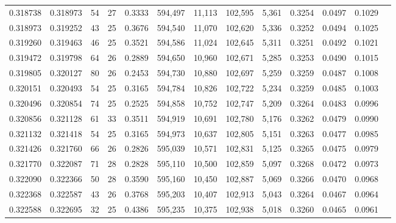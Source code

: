 \begin{tabular}{rrrrrrrrrrrrr}
0.318738 & 0.318973 &  54 &  27 &                                     0.3333 & 594,497 &  11,113 & 102,595 &   5,361 & 0.3254 & 0.0497 & 0.1029 \\
0.318973 & 0.319252 &  43 &  25 &                                     0.3676 & 594,540 &  11,070 & 102,620 &   5,336 & 0.3252 & 0.0494 & 0.1025 \\
0.319260 & 0.319463 &  46 &  25 &                                     0.3521 & 594,586 &  11,024 & 102,645 &   5,311 & 0.3251 & 0.0492 & 0.1021 \\
0.319472 & 0.319798 &  64 &  26 &                                     0.2889 & 594,650 &  10,960 & 102,671 &   5,285 & 0.3253 & 0.0490 & 0.1015 \\
0.319805 & 0.320127 &  80 &  26 &                                     0.2453 & 594,730 &  10,880 & 102,697 &   5,259 & 0.3259 & 0.0487 & 0.1008 \\
0.320151 & 0.320493 &  54 &  25 &                                     0.3165 & 594,784 &  10,826 & 102,722 &   5,234 & 0.3259 & 0.0485 & 0.1003 \\
0.320496 & 0.320854 &  74 &  25 &                                     0.2525 & 594,858 &  10,752 & 102,747 &   5,209 & 0.3264 & 0.0483 & 0.0996 \\
0.320856 & 0.321128 &  61 &  33 &                                     0.3511 & 594,919 &  10,691 & 102,780 &   5,176 & 0.3262 & 0.0479 & 0.0990 \\
0.321132 & 0.321418 &  54 &  25 &                                     0.3165 & 594,973 &  10,637 & 102,805 &   5,151 & 0.3263 & 0.0477 & 0.0985 \\
0.321426 & 0.321760 &  66 &  26 &                                     0.2826 & 595,039 &  10,571 & 102,831 &   5,125 & 0.3265 & 0.0475 & 0.0979 \\
0.321770 & 0.322087 &  71 &  28 &                                     0.2828 & 595,110 &  10,500 & 102,859 &   5,097 & 0.3268 & 0.0472 & 0.0973 \\
0.322090 & 0.322366 &  50 &  28 &                                     0.3590 & 595,160 &  10,450 & 102,887 &   5,069 & 0.3266 & 0.0470 & 0.0968 \\
0.322368 & 0.322587 &  43 &  26 &                                     0.3768 & 595,203 &  10,407 & 102,913 &   5,043 & 0.3264 & 0.0467 & 0.0964 \\
0.322588 & 0.322695 &  32 &  25 &                                     0.4386 & 595,235 &  10,375 & 102,938 &   5,018 & 0.3260 & 0.0465 & 0.0961 \\

\end{tabular}
